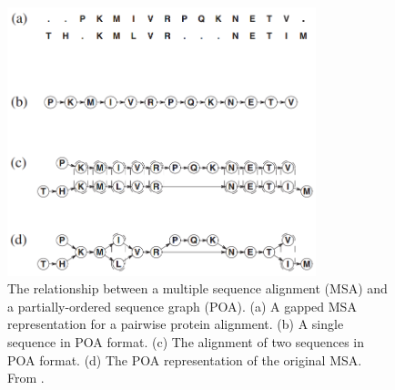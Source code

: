 \documentclass{article}
\begin{document}
\begin{figure}
\centering
\includegraphics[width=0.8\textwidth]{figures/poamsa}
\caption{\label{fig:poa}
The relationship between a multiple sequence alignment (MSA) and a partially-ordered sequence graph (POA). (a) A gapped MSA representation for a pairwise protein alignment. (b) A single sequence in POA format. (c) The alignment of two sequences in POA format. (d) The POA representation of the original MSA. From \cite{lee2002POA}.
}
\end{figure}
\end{document}
